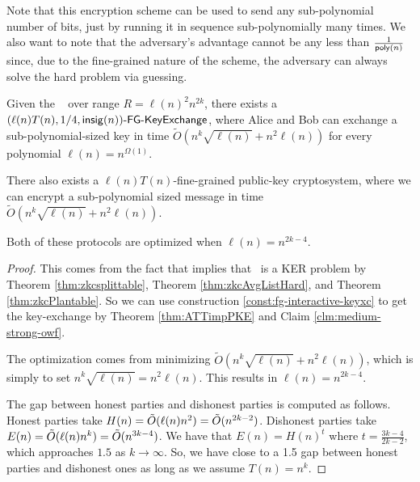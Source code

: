 Note that this encryption scheme can be used to send any sub-polynomial number of bits, just by running it in sequence sub-polynomially many times. %
 We also want to note that the adversary's advantage cannot be any less than $\frac{1}{ \poly(n)}$ since, due to the fine-grained nature of the scheme, the adversary can always solve the hard problem via guessing.


\begin{corollary}
	Given the \strongzkc~ over range $R = \ell(n)^2 n^{2k}$, there exists a\\ $\fgkeyxc{\ell(n)T(n)}{1/4}{\insig(n)}$, where Alice and Bob can exchange a sub-polynomial-sized key in time $\tilde{O}\left(n^{k}\sqrt{\ell(n)} + n^2\ell(n)\right)$ for every polynomial $\ell(n)= n ^{\Omega(1)}$.
	
	There also exists a $\ell(n)T(n)$-fine-grained public-key cryptosystem, where we can encrypt a sub-polynomial sized message in time $\tilde{O}\left(n^{k}\sqrt{\ell(n)} + n^2\ell(n)\right)$.
	
	Both of these protocols are optimized when $\ell(n) = n^{2k-4}$.
	\label{cor:kcliqueKeyExchange}
\end{corollary}
\begin{proof}
	This comes from the fact that \strongzkc implies that \zkclique~is a KER problem by Theorem \ref{thm:zkcsplittable}, Theorem \ref{thm:zkcAvgListHard}, and Theorem \ref{thm:zkcPlantable}.  So we can use construction \ref{const:fg-interactive-keyxc} to get the key-exchange by Theorem \ref{thm:ATTimpPKE} and Claim \ref{clm:medium-strong-owf}. %
	
	The optimization comes from minimizing $\tilde{O}\left(n^{k}\sqrt{\ell(n)} + n^2\ell(n)\right)$, which is simply to set $n^k \sqrt{\ell(n)} = n^2 \ell(n)$. This results in $\ell(n) = n^{2k - 4}$.
	
	The gap between honest parties and dishonest parties is computed as follows. Honest parties take $H(n) = \~O(\ell(n)n^2) = \~O(n^{2k - 2})$. Dishonest parties take $E(n) = \~O(\ell(n)n^k) = \~O(n^{3k - 4})$. We have that $E(n) = H(n)^t$ where $t = \frac{3k-4}{2k-2}$, which approaches $1.5$ as $k \to \infty$. So, we have close to a 1.5 gap between honest parties and dishonest ones as long as we assume $T(n) = n^{k}$.
\end{proof}


